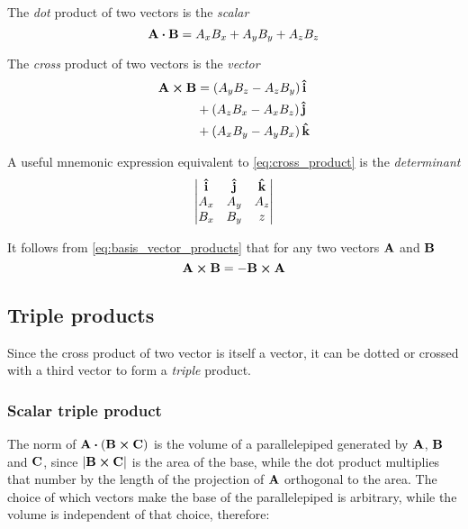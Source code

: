 The \textit{dot} product of two vectors is the \textit{scalar}  
\begin{equation}
\vb{A} \vdot \vb{B} = A_x B_x + A_y B_y + A_z B_z 
\label{eq:dot_product}
\end{equation}

The \textit{cross} product of two vectors is the \textit{vector}  
\begin{equation}
\begin{aligned}
\vb{A} \cross \vb{B} &= (A_y B_z - A_z B_y)\, \vu{i} \\
                     &+ (A_z B_x - A_x B_z)\, \vu{j} \\
                     &+ (A_x B_y - A_y B_x)\, \vu{k}
\end{aligned}
\label{eq:cross_product}
\end{equation}

A useful mnemonic expression equivalent to \ref{eq:cross_product} is the \textit{determinant} 
\begin{equation*}
\mqty| \vu{i} &  \vu{j} &  \vu{k} \\ 
A_x & A_y & A_z \\
B_x & B_y &z|
\end{equation*}


It follows from \ref{eq:basis_vector_products} that for any two vectors $\vb{A}$ and $\vb{B}$ 
\begin{equation}
\vb{A} \cross \vb{B} = - \vb{B} \cross \vb{A}
\label{eq:cross_product_reflection}
\end{equation}

\subsection{Triple products}
Since the cross product of two vector is itself a vector, it can be dotted or crossed with a third vector to form a \textit{triple} product. 

\subsubsection{Scalar triple product}
The norm of $\vb{A} \vdot (\vb{B} \cross \vb{C})$ is the volume of a parallelepiped generated by $\vb{A}$, $\vb{B}$ and $\vb{C}$, since $\abs{ \vb{B} \cross \vb{C} }$ is the area of the base, while the dot product multiplies that number by the length of the projection of $\vb{A}$ orthogonal to the area. The choice of which vectors make the base of the parallelepiped is arbitrary, while the volume is independent of that choice, therefore: 

